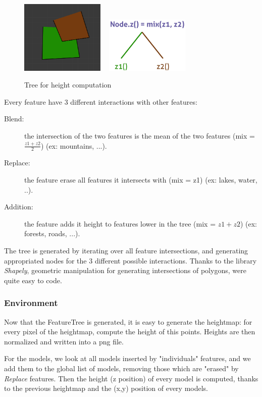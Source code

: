 \begin{figure}[h]
  \begin{center}
      \includegraphics[width=4cm]{img/feature_2.png} ~
      \includegraphics[width=4cm]{img/mix.pdf}
      \caption{Tree for height computation}
      \label{fig:tree}
   \end{center}
\end{figure}

Every feature have 3 different interactions with other features:
\begin{description}
  \item[Blend:] the intersection of the two features is the mean of the two features 
  (mix = $\frac{z1+z2}{2}$) (ex: mountains, ...).
  \item[Replace:] the feature erase all features it intersects with (mix = z1) (ex: lakes, water, ..).
  \item[Addition:] the feature adds it height to features lower in the tree (mix = $z1+z2$) (ex: forests, roads, ...).
\end{description}

The tree is generated by iterating over all feature intersections, and generating appropriated nodes for the 3 different possible interactions.
Thanks to the library \textit{Shapely}, geometric manipulation for generating intersections of polygons, were quite easy to code.

\subsubsection{Environment}
Now that the FeatureTree is generated, it is easy to generate the heightmap: for every pixel of the heightmap, compute the height of this points. Heights are then normalized and written into a png file.

For the models, we look at all models inserted by "individuals" features, and we add them to the global list of models, removing those which are "erased" by \textit{Replace} features. Then the height (z position) of every model is computed, thanks to the previous heightmap and the (x,y) position of every models.

